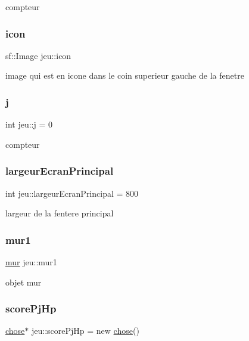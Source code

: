 compteur \mbox{\label{classjeu_a0b83688b41ae808f264c473b6a1d253f}} 
\subsubsection{\texorpdfstring{icon}{icon}}
{\footnotesize\ttfamily sf\+::\+Image jeu\+::icon}

image qui est en icone dans le coin superieur gauche de la fenetre \mbox{\label{classjeu_a91c0fab688b58c38cd214c0d8cd8cc8e}} 
\subsubsection{\texorpdfstring{j}{j}}
{\footnotesize\ttfamily int jeu\+::j = 0}

compteur \mbox{\label{classjeu_a1fcaf4729384cac7fdeb17bad1d602b0}} 
\subsubsection{\texorpdfstring{largeur\+Ecran\+Principal}{largeurEcranPrincipal}}
{\footnotesize\ttfamily int jeu\+::largeur\+Ecran\+Principal = 800}

largeur de la fentere principal \mbox{\label{classjeu_aae067b47cfeb93fa11ddf3b7d1c9910d}} 
\subsubsection{\texorpdfstring{mur1}{mur1}}
{\footnotesize\ttfamily \mbox{\hyperlink{classmur}{mur}} jeu\+::mur1}

objet mur \mbox{\label{classjeu_a80f00b1c807ea6817bdb432a069600b7}} 
\subsubsection{\texorpdfstring{score\+Pj\+Hp}{scorePjHp}}
{\footnotesize\ttfamily \mbox{\hyperlink{classchose}{chose}}$\ast$ jeu\+::score\+Pj\+Hp = new \mbox{\hyperlink{classchose}{chose}}()}

